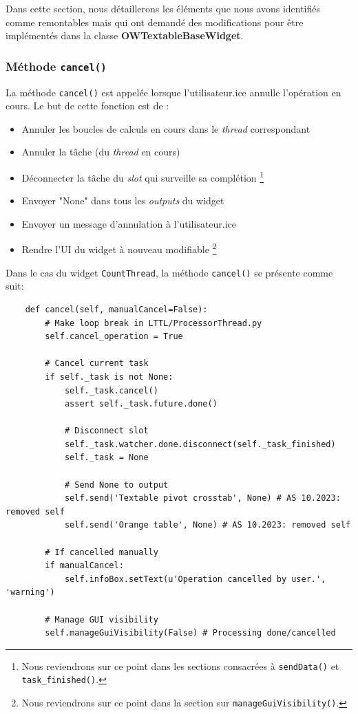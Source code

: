\documentclass{article}
\begin{document}
Dans cette section, nous détaillerons les éléments que nous avons identifiés comme remontables mais qui ont demandé des modifications pour être implémentés dans la classe \textbf{OWTextableBaseWidget}.

\subsubsection{Méthode \texttt{cancel()}}

La méthode \texttt{cancel()} est appelée lorsque l'utilisateur.ice annulle l'opération en cours. Le but de cette fonction est de :
\vspace{5mm}
\begin{itemize}
    \item Annuler les boucles de calculs en cours dans le \textit{thread} correspondant
    \item Annuler la tâche (du \textit{thread} en cours)
    \item Déconnecter la tâche du \textit{slot} qui surveille sa complétion \footnote{Nous reviendrons sur ce point dans les sections consacrées à \texttt{sendData()} et \texttt{task\_finished()}.}
    \item Envoyer "None" dans tous les \textit{outputs} du widget
    \item Envoyer un message d'annulation à l'utilisateur.ice
    \item Rendre l'UI du widget à nouveau modifiable \footnote{Nous reviendrons sur ce point dans la section sur \texttt{manageGuiVisibility()}.}
\end{itemize}

Dans le cas du widget \texttt{CountThread}, la méthode \texttt{cancel()} se présente comme suit:

\begin{verbatim}
    def cancel(self, manualCancel=False):
        # Make loop break in LTTL/ProcessorThread.py 
        self.cancel_operation = True

        # Cancel current task
        if self._task is not None:
            self._task.cancel()
            assert self._task.future.done()
            
            # Disconnect slot
            self._task.watcher.done.disconnect(self._task_finished)
            self._task = None
            
            # Send None to output 
            self.send('Textable pivot crosstab', None) # AS 10.2023: removed self
            self.send('Orange table', None) # AS 10.2023: removed self

        # If cancelled manually
        if manualCancel:
            self.infoBox.setText(u'Operation cancelled by user.', 'warning')

        # Manage GUI visibility
        self.manageGuiVisibility(False) # Processing done/cancelled
\end{verbatim}
\end{document}
